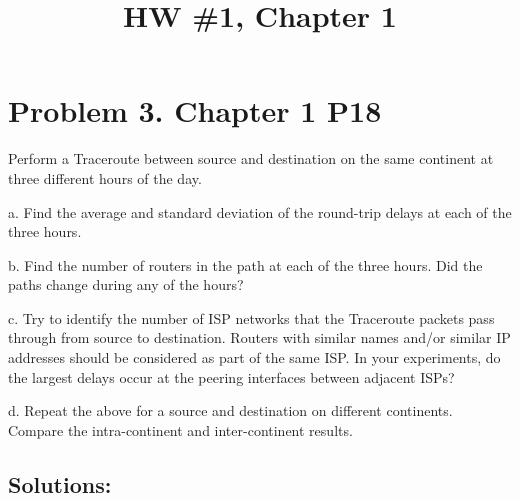 \documentclass{cshwk}
\begin{document}
\title{HW \#1, Chapter 1}
\maketitle


\section{Problem 3. Chapter 1 P18}
Perform a Traceroute between source and destination on the same continent at three different hours of the day.

a. Find the average and standard deviation of the round-trip delays at each of the three hours.

b. Find the number of routers in the path at each of the three hours. Did the paths change during any of the hours?

c. Try to identify the number of ISP networks that the Traceroute packets pass through from source to destination. Routers with similar names and/or similar IP addresses should be considered as part of the same ISP. In your experiments, do the largest delays occur at the peering interfaces between adjacent ISPs?

d. Repeat the above for a source and destination on different continents. Compare the intra-continent and inter-continent results.
\subsection*{Solutions:}
\end{document}
